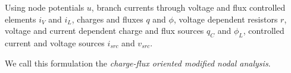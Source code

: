 Using node potentials $u$, branch currents through voltage and flux controlled elements $i_V$ and $i_L$, charges and fluxes $q$ and $\phi$, voltage dependent resistors $r$, voltage and current dependent charge and flux sources $q_C$ and $\phi_L$, controlled current and voltage sources $i_{src}$ and $v_{src}$.

We call this formulation the \emph{charge-flux oriented modified nodal analysis}.

